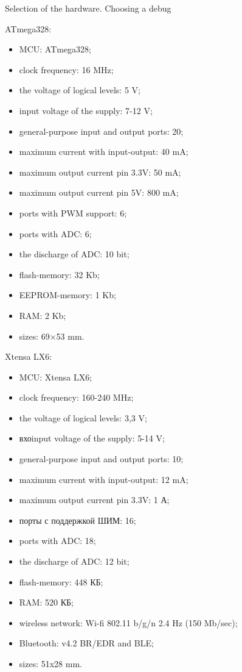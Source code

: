 \documentclass[12pt,a4paper,mathserif]{beamer}
\begin{document}
\begin{frame}{\small Selection of the hardware. Choosing a debug}
    \tiny
    \begin{minipage}{0.5\linewidth}
    ATmega328:
    \begin{itemize}
        \item MCU: ATmega328;
        \item clock frequency: 16 MHz;
        \item the voltage of logical levels: 5 V;
        \item input voltage of the supply: 7-12 V;
        \item general-purpose input and output ports: 20;
        \item maximum current with input-output: 40 mA;
        \item maximum output current pin 3.3V: 50 mA;
        \item maximum output current pin 5V: 800 mA;
        \item ports with PWM support: 6;
        \item ports with ADC: 6;
        \item the discharge of ADC: 10 bit;
        \item flash-memory: 32 Kb;
        \item EEPROM-memory: 1 Kb;
        \item RAM: 2 Kb;
        \item sizes: 69×53 mm.
    \end{itemize}
    \end{minipage}
    \hfill
    \begin{minipage}{0.5\linewidth}
    Xtensa LX6:
    \begin{itemize}
        \item MCU: Xtensa LX6;
        \item clock frequency: 160-240 MHz;
        \item the voltage of logical levels: 3,3 V;
        \item вхоinput voltage of the supply: 5-14 V;
        \item general-purpose input and output ports: 10;
        \item maximum current with input-output: 12 mA;
        \item maximum output current pin 3.3V: 1 А;
        \item порты с поддержкой ШИМ: 16;
        \item ports with ADC: 18;
        \item the discharge of ADC: 12 bit;
        \item flash-memory: 448 КБ;
        \item RAM: 520 КБ;
        \item wireless network: Wi-fi 802.11 b/g/n 2.4 Hz (150 Mb/sec);
        \item Bluetooth: v4.2 BR/EDR and BLE;
        \item sizes: 51x28 mm.
    \end{itemize}
    \end{minipage}
\end{frame}
\end{document}
